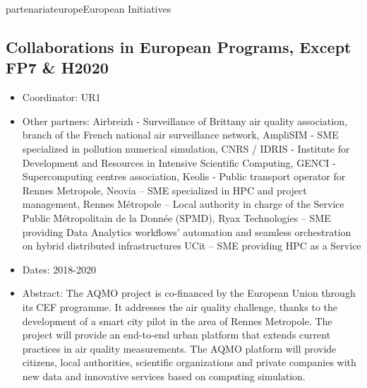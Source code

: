 \documentclass{ra2018}
\begin{document}
\begin{module}{partenariat}{europe}{European Initiatives}
\subsection{Collaborations in European Programs, Except FP7 \& H2020}
\begin{itemize}
	\item Coordinator: UR1
	\item Other partners: Airbreizh - Surveillance of Brittany air quality association, branch of the French national air surveillance network, AmpliSIM - SME specialized in pollution numerical simulation, CNRS / IDRIS - Institute for Development and Resources in Intensive Scientific Computing, GENCI - Supercomputing centres association, Keolis - Public transport operator for Rennes Metropole,	Neovia – SME specialized in HPC and project management, Rennes Métropole – Local authority in charge of the Service Public Métropolitain de la Donnée (SPMD), Ryax Technologies – SME providing Data Analytics workflows’ automation and seamless orchestration on hybrid distributed infrastructures
	UCit – SME providing HPC as a Service
	\item Dates: 2018-2020
	\item Abstract: The AQMO project is co-financed by the European Union through its CEF programme. It addresses the air quality challenge, thanks to the development of a smart city pilot in the area of Rennes Metropole. The project will provide an end-to-end urban platform that extends current practices in air quality measurements. The AQMO platform will provide citizens, local authorities, scientific organizations and private companies with new data and innovative services based on computing simulation.

\end{itemize}




\end{module}
\end{document}
